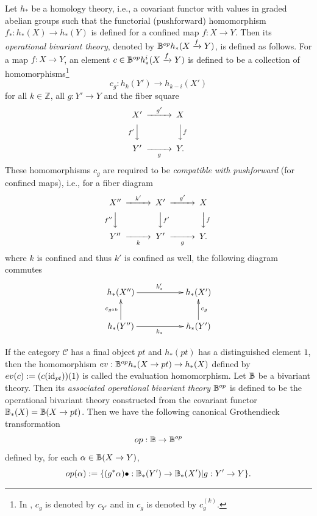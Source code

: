 \documentclass[a4paper]{amsart}
\begin{document}
Let $h_*$ be a homology theory, i.e., a covariant functor with values in graded abelian groups such that the functorial (pushforward) homomorphism $f_*:h_*(X) \to h_*(Y)$ is defined for a confined map $f:X \to Y$.  Then its \emph{operational bivariant theory}, denoted by $\mathbb B^{op}h_*(X \xrightarrow f Y)$, is defined as follows. For a map $f:X \to Y$, an element $c \in \mathbb B^{op}h_*^i(X \xrightarrow f Y)$ is defined to be a collection of
homomorphisms\footnote{In \cite[\S 8 \underline{Operational Theories}]{FM}, $c_g$ is denoted by $c_{Y'}$ and in \cite[\S 17. 1]{Ful} $c_g$ is denoted by $c^{(k)}_g$.}
\begin{equation*}
c_g:h_k(Y') \to h_{k-i}(X')
\end{equation*}
for all $k \in \mathbb Z$, all $g:Y' \to Y$ and the fiber square \, \, \, 
$$\CD
X' @> {g'}  >> X\\
@V {f'} VV @VV fV\\
Y' @>> {g} > Y.\\
\endCD
$$
These homomorphisms $c_g$ are
required to be \emph{compatible with pushforward} (for confined maps), i.e., for a fiber diagram
\, \, \, 
$$\CD
X'' @> {k'}  >> X' @> {g'}  >> X\\
@V {f''} VV @VV f'V @VV fV\\
Y'' @>> {k} > Y' @>> {g} > Y.\\
\endCD
$$
where $k$ is confined and thus $k'$ is confined as well, 
the following diagram commutes
\begin{equation}
\xymatrix
{h_*(X'')  \ar[rr]^{k'_*} && h_*(X')\\
h_*(Y'') \ar[u]^{c_{g\circ k}}  \ar[rr]_{k_*} && h_*(Y') \ar[u]_{c_g}
}
\end{equation}

If the category $\mathscr C$ has a final object $pt$ and $h_*(pt)$ has a distinguished element $1$, then the homomorphism $ev:\mathbb B^{op}h_*(X \to pt) \to h_*(X)$ defined by $ev(c) := (c(\operatorname{id}_{pt}))(1)$ is called the evaluation homomorphism.
Let $\mathbb B$ be a bivariant theory. Then its \emph{associated operational bivariant theory} $\mathbb B^{op}$ is defined to be the operational bivariant theory constructed from the covariant functor $\mathbb B_*(X) = \mathbb B(X \to pt)$. Then we have the following canonical Grothendieck transformation
$$ op:\mathbb B \to \mathbb B^{op}$$
defined by, for each $\alpha \in \mathbb B(X \to Y)$,
$$
op(\alpha):= \{ (g^*\alpha) \bullet : \mathbb B_*(Y') \to \mathbb B_*(X') | g:Y' \to Y \}.
$$
\end{document}
